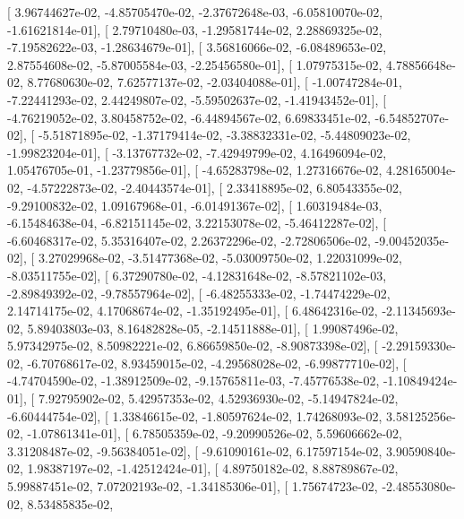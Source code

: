 \documentclass{article}
\begin{document}
       [  3.96744627e-02,  -4.85705470e-02,  -2.37672648e-03,
         -6.05810070e-02,  -1.61621814e-01],
       [  2.79710480e-03,  -1.29581744e-02,   2.28869325e-02,
         -7.19582622e-03,  -1.28634679e-01],
       [  3.56816066e-02,  -6.08489653e-02,   2.87554608e-02,
         -5.87005584e-03,  -2.25456580e-01],
       [  1.07975315e-02,   4.78856648e-02,   8.77680630e-02,
          7.62577137e-02,  -2.03404088e-01],
       [ -1.00747284e-01,  -7.22441293e-02,   2.44249807e-02,
         -5.59502637e-02,  -1.41943452e-01],
       [ -4.76219052e-02,   3.80458752e-02,  -6.44894567e-02,
          6.69833451e-02,  -6.54852707e-02],
       [ -5.51871895e-02,  -1.37179414e-02,  -3.38832331e-02,
         -5.44809023e-02,  -1.99823204e-01],
       [ -3.13767732e-02,  -7.42949799e-02,   4.16496094e-02,
          1.05476705e-01,  -1.23779856e-01],
       [ -4.65283798e-02,   1.27316676e-02,   4.28165004e-02,
         -4.57222873e-02,  -2.40443574e-01],
       [  2.33418895e-02,   6.80543355e-02,  -9.29100832e-02,
          1.09167968e-01,  -6.01491367e-02],
       [  1.60319484e-03,  -6.15484638e-04,  -6.82151145e-02,
          3.22153078e-02,  -5.46412287e-02],
       [ -6.60468317e-02,   5.35316407e-02,   2.26372296e-02,
         -2.72806506e-02,  -9.00452035e-02],
       [  3.27029968e-02,  -3.51477368e-02,  -5.03009750e-02,
          1.22031099e-02,  -8.03511755e-02],
       [  6.37290780e-02,  -4.12831648e-02,  -8.57821102e-03,
         -2.89849392e-02,  -9.78557964e-02],
       [ -6.48255333e-02,  -1.74474229e-02,   2.14714175e-02,
          4.17068674e-02,  -1.35192495e-01],
       [  6.48642316e-02,  -2.11345693e-02,   5.89403803e-03,
          8.16482828e-05,  -2.14511888e-01],
       [  1.99087496e-02,   5.97342975e-02,   8.50982221e-02,
          6.86659850e-02,  -8.90873398e-02],
       [ -2.29159330e-02,  -6.70768617e-02,   8.93459015e-02,
         -4.29568028e-02,  -6.99877710e-02],
       [ -4.74704590e-02,  -1.38912509e-02,  -9.15765811e-03,
         -7.45776538e-02,  -1.10849424e-01],
       [  7.92795902e-02,   5.42957353e-02,   4.52936930e-02,
         -5.14947824e-02,  -6.60444754e-02],
       [  1.33846615e-02,  -1.80597624e-02,   1.74268093e-02,
          3.58125256e-02,  -1.07861341e-01],
       [  6.78505359e-02,  -9.20990526e-02,   5.59606662e-02,
          3.31208487e-02,  -9.56384051e-02],
       [ -9.61090161e-02,   6.17597154e-02,   3.90590840e-02,
          1.98387197e-02,  -1.42512424e-01],
       [  4.89750182e-02,   8.88789867e-02,   5.99887451e-02,
          7.07202193e-02,  -1.34185306e-01],
       [  1.75674723e-02,  -2.48553080e-02,   8.53485835e-02,
\end{document}
